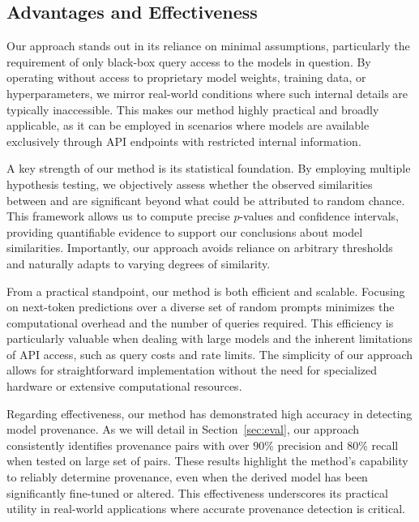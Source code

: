 \subsection{Advantages and Effectiveness}

Our approach stands out in its reliance on minimal assumptions, particularly the requirement of only black-box query access to the models in question. By operating without access to proprietary model weights, training data, or hyperparameters, we mirror real-world conditions where such internal details are typically inaccessible. This makes our method highly practical and broadly applicable, as it can be employed in scenarios where models are available exclusively through API endpoints with restricted internal information.

%
A key strength of our method is its statistical foundation. 
By employing multiple hypothesis testing, we objectively assess whether the observed similarities between \llmf and \llmp are significant beyond what could be attributed to random chance. This framework allows us to compute precise $p$-values and confidence intervals, providing quantifiable evidence to support our conclusions about model similarities. Importantly, our approach avoids reliance on arbitrary thresholds and naturally adapts to varying degrees of similarity.
%

From a practical standpoint, our method is both efficient and scalable. Focusing on next-token predictions over a diverse set of random prompts minimizes the computational overhead and the number of queries required. This efficiency is particularly valuable when dealing with large models and the inherent limitations of API access, such as query costs and rate limits. The simplicity of our approach allows for straightforward implementation without the need for specialized hardware or extensive computational resources.

Regarding effectiveness, our method has demonstrated high accuracy in detecting model provenance. As we will detail in Section~\ref{sec:eval}, our approach consistently identifies provenance pairs with over $90$\% precision and $80$\% recall when tested on large set of pairs. These results highlight the method's capability to reliably determine provenance, even when the derived model has been significantly fine-tuned or altered. This effectiveness underscores its practical utility in real-world applications where accurate provenance detection is critical.

%

